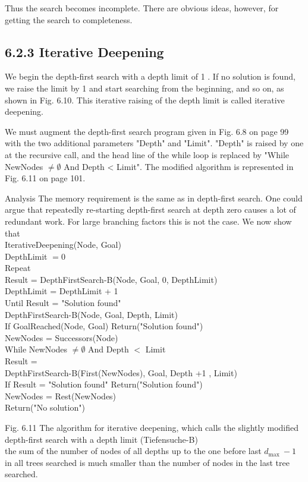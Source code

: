 \documentclass[10pt]{book}
\begin{document}
\begin{center}
Thus the search becomes incomplete. There are obvious ideas, however, for getting the search to completeness.


\subsection*{6.2.3 Iterative Deepening}
We begin the depth-first search with a depth limit of 1 . If no solution is found, we raise the limit by 1 and start searching from the beginning, and so on, as shown in Fig. 6.10. This iterative raising of the depth limit is called iterative deepening.

We must augment the depth-first search program given in Fig. 6.8 on page 99 with the two additional parameters "Depth" and "Limit". "Depth" is raised by one at the recursive call, and the head line of the while loop is replaced by "While NewNodes $\neq \emptyset$ And Depth < Limit". The modified algorithm is represented in Fig. 6.11 on page 101.

Analysis The memory requirement is the same as in depth-first search. One could argue that repeatedly re-starting depth-first search at depth zero causes a lot of redundant work. For large branching factors this is not the case. We now show that\\
IterativeDeepening(Node, Goal)\\
DepthLimit $=0$\\
Repeat\\
Result = DepthFirstSearch-B(Node, Goal, 0, DepthLimit)\\
DepthLimit = DepthLimit + 1\\
Until Result = "Solution found"\\
DepthFirstSearch-B(Node, Goal, Depth, Limit)\\
If GoalReached(Node, Goal) Return("Solution found")\\
NewNodes = Successors(Node)\\
While NewNodes $\neq \emptyset$ And Depth $<$ Limit\\
Result =\\
DepthFirstSearch-B(First(NewNodes), Goal, Depth +1 , Limit)\\
If Result = "Solution found" Return("Solution found")\\
NewNodes = Rest(NewNodes)\\
Return("No solution")

Fig. 6.11 The algorithm for iterative deepening, which calls the slightly modified depth-first search with a depth limit (Tiefensuche-B)\\
the sum of the number of nodes of all depths up to the one before last $d_{\text {max }}-1$ in all trees searched is much smaller than the number of nodes in the last tree searched.



\end{center}
\end{document}
